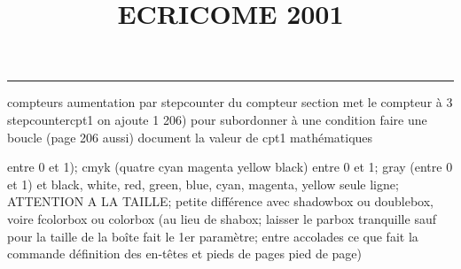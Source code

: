 \documentclass[11pt]{article}%
\title{\bf \vspace{-2cm} ECRICOME 2001} %
\author{} %
\date{} %
\renewcommand{\headrulewidth}{0pt}%
\renewcommand{\footrulewidth}{0.4pt}%
\begin{document}
\maketitle %
\vspace{-1.4cm}\hrule %
\thispagestyle{fancy}

\vspace*{.2cm}



compteurs%
aumentation par stepcounter du compteur section%
met le compteur à 3%
stepcounter{cpt1} on ajoute 1%
206) pour subordonner à une condition %
faire une boucle (page 206 aussi) %
document la valeur de cpt1 
mathématiques\newcommand{\ch}{\operatorname{ch}} 
\newcommand{\sh}{\operatorname{sh}}
\renewcommand{\tanh}{\operatorname{th}}
\renewcommand{\sinh}{\operatorname{sh}}
\renewcommand{\cosh}{\operatorname{ch}}
\newcommand{\argsh}{\operatorname{argsh}}
\newcommand{\argch}{\operatorname{argch}}
\newcommand{\argth}{\operatorname{argth}}
\newcommand{\Id}{\operatorname{Id}}

entre 0 et 1); cmyk (quatre cyan magenta yellow black) entre 0 et 1;
gray (entre 0 et 1) et black, white, red, green, blue, cyan, magenta,
yellow%
seule ligne; ATTENTION A LA TAILLE; petite différence avec shadowbox ou
doublebox, voire fcolorbox ou colorbox (au lieu de shabox; laisser le
parbox tranquille sauf pour la taille de la boîte
\newcommand{\Tbox}[1]{\begin{center} \shabox{\parbox{0.6
\linewidth}{#1}} \end{center}} %
fait le 1er paramètre; entre accolades ce que fait la commande
définition des en-têtes et pieds de pages\pagestyle{fancy}
\chead{}
\rfoot[ \ \thepage]{\thepage}
\cfoot{}
\lfoot{}
\thispagestyle{fancy} %
pied de page)\renewcommand{\footrulewidth}{0.4pt}
\renewcommand{\headrulewidth}{0.4pt}
\end{document}
